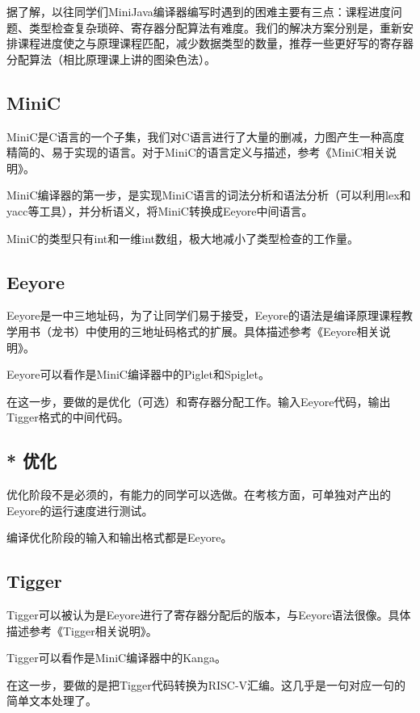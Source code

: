 \documentclass[a4paper]{ctexart}
\begin{document}
据了解，以往同学们MiniJava编译器编写时遇到的困难主要有三点：课程进度问题、类型检查复杂琐碎、寄存器分配算法有难度。我们的解决方案分别是，重新安排课程进度使之与原理课程匹配，减少数据类型的数量，推荐一些更好写的寄存器分配算法（相比原理课上讲的图染色法）。

\subsection{MiniC}

MiniC是C语言的一个子集，我们对C语言进行了大量的删减，力图产生一种高度精简的、易于实现的语言。对于MiniC的语言定义与描述，参考《MiniC相关说明》。

MiniC编译器的第一步，是实现MiniC语言的词法分析和语法分析（可以利用lex和yacc等工具），并分析语义，将MiniC转换成Eeyore中间语言。

MiniC的类型只有int和一维int数组，极大地减小了类型检查的工作量。

\subsection{Eeyore}

Eeyore是一中三地址码，为了让同学们易于接受，Eeyore的语法是编译原理课程教学用书（龙书）中使用的三地址码格式的扩展。具体描述参考《Eeyore相关说明》。

Eeyore可以看作是MiniC编译器中的Piglet和Spiglet。

在这一步，要做的是优化（可选）和寄存器分配工作。输入Eeyore代码，输出Tigger格式的中间代码。

\subsection{* 优化}

优化阶段不是必须的，有能力的同学可以选做。在考核方面，可单独对产出的Eeyore的运行速度进行测试。

编译优化阶段的输入和输出格式都是Eeyore。

\subsection{Tigger}

Tigger可以被认为是Eeyore进行了寄存器分配后的版本，与Eeyore语法很像。具体描述参考《Tigger相关说明》。

Tigger可以看作是MiniC编译器中的Kanga。

在这一步，要做的是把Tigger代码转换为RISC-V汇编。这几乎是一句对应一句的简单文本处理了。
\end{document}
